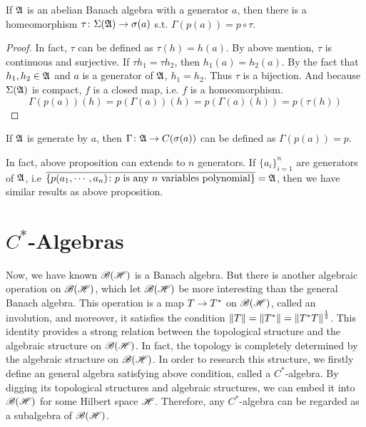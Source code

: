 \documentclass[a4paper,11pt]{report}
\begin{document}
\begin{prop} \label{prop7}
	If $\mathfrak{A}$ is an abelian Banach algebra with a generator $a$, then there is a homeomorphism $\tau \colon \Sigma(\mathfrak{A}) \rightarrow \sigma(a)$ s.t. $\Gamma(p(a)) = p \circ \tau$.
\end{prop}
\begin{proof}
	In fact, $\tau$ can be defined as $\tau(h)=h(a)$. By above mention, $\tau$ is continuous and surjective. If $\tau{h_1}=\tau{h_2}$, then $ h_1(a) = h_2(a)$. By the fact that $h_1,h_2 \in \mathfrak{A}$ and $a$ is a generator of $\mathfrak{A}$, $h_1=h_2$. Thus $\tau$ is a bijection. And because $\Sigma(\mathfrak{A})$ is compact, $f$ is a closed map, i.e. $f$ is a homeomorphism.
	\begin{equation*}
		\Gamma(p(a))(h) = p(\Gamma(a))(h) = p(\Gamma(a)(h)) = p(\tau(h))
	\end{equation*}
\end{proof}
\begin{rem}
	If $\mathfrak{A}$ is generate by $a$, then $\Gamma \colon \mathfrak{A} \rightarrow C(\sigma(a))$ can be defined as $\Gamma(p(a)) = p$. 
\end{rem}

In fact, above proposition can extends to $n$ generators. If $\{a_i\}_{i=1}^{n}$ are generators of $\mathfrak{A}$, i.e $\overline{\{p(a_1,\cdots,a_n) \colon p \text{ is any } n \text{ variables polynomial}\}} = \mathfrak{A}$, then we have similar results as above proposition.


\section{\texorpdfstring{$C^{*}$-Algebras}{C*-Algebras}}

Now, we have known $\mathscr{B(H)}$ is a Banach algebra. But there is another algebraic operation on $\mathscr{B(H)}$, which let $\mathscr{B(H)}$ be more interesting than the general Banach algebra. This operation is a map $T \rightarrow T^{*}$ on $\mathscr{B(H)}$, called an involution, and moreover, it satisfies the condition $\left\lVert T\right\lVert = \left\lVert T^{*}\right\lVert = \left\lVert T^{*}T\right\lVert^{\frac{1}{2}}$. This identity provides a strong relation between the topological structure and the algebraic structure on $\mathscr{B(H)}$. In fact, the topology is completely determined by the algebraic structure on $\mathscr{B(H)}$. In order to research this structure, we firstly define an general algebra satisfying above condition, called a $C^{*}$-algebra. By digging its topological structures and algebraic structures, we can embed it into $\mathscr{B(H)}$ for some Hilbert space $\mathscr{H}$. Therefore, any $C^{*}$-algebra can be regarded as a subalgebra of $\mathscr{B(H)}$.
\end{document}
